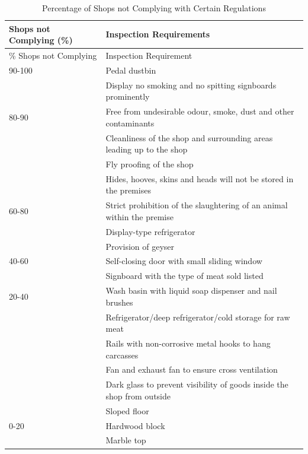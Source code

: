 \documentclass[a4paper, 12pt]{article}
\newcommand\tabitem{\makebox[1em][r]{\textbullet~}}
\begin{document}
\small
\begin{longtable}{>{\raggedright}p{2.8cm}>{\raggedright\arraybackslash}p{12cm}}
\caption{Percentage of Shops not Complying with Certain Regulations} \\ 
\toprule
Shops not Complying (\%) & Inspection Requirements \\
\midrule
\endfirsthead
\% Shops not Complying & Inspection Requirement \\
\toprule
\endhead
\endfoot
\hline
\endlastfoot

90-100 & \tabitem Pedal dustbin \\
 & \tabitem Display no smoking and no spitting signboards prominently \\
 \midrule
80-90 & \tabitem Free from undesirable odour, smoke, dust and other contaminants \\
 &  \tabitem Cleanliness of the shop and surrounding areas leading up to the shop \\
 & \tabitem Fly proofing of the shop \\
 & \tabitem Hides, hooves, skins and heads will not be stored in the premises \\
\midrule
60-80 & \tabitem Strict prohibition of the slaughtering of an animal within the premise \\
 & \tabitem Display-type refrigerator \\
 & \tabitem Provision of geyser \\
\midrule
40-60 & \tabitem Self-closing door with small sliding window \\
 & \tabitem Signboard with the type of meat sold listed \\
\midrule
20-40 & \tabitem Wash basin with liquid soap dispenser and nail brushes \\
 & \tabitem Refrigerator/deep refrigerator/cold storage for raw meat \\
 & \tabitem Rails with non-corrosive metal hooks to hang carcasses \\
 & \tabitem Fan and exhaust fan to ensure cross ventilation \\
 & \tabitem Dark glass to prevent visibility of goods inside the shop from outside \\
 & \tabitem Sloped floor \\
\midrule
0-20 & \tabitem Hardwood block \\
 & \tabitem Marble top \\

\end{longtable}
\normalsize
\end{document}
